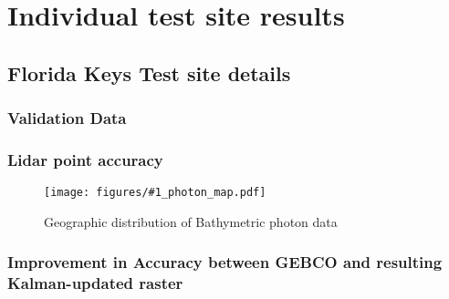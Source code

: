 
\chapter{Individual test site results}
\newcommand{\sitesummary}[2]{

\section{#2 Test site details}

\subsection{Validation Data}


\subsection{Lidar point accuracy}
% 


\begin{figure}[h!]
    \centering
    \texttt{[image: figures/\#1\_photon\_map.pdf]}
    \caption{Geographic distribution of Bathymetric photon data}
\end{figure}




\subsection{Improvement in Accuracy between GEBCO and resulting Kalman-updated raster}


}

\sitesummary{Florida\_keys}{Florida Keys}